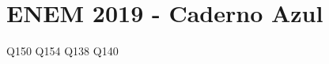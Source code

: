 \chapter{ENEM 2019 - Caderno Azul}

\begin{multicols}{2}
{Q150}
{Q154}
{Q138}
{Q140}
%
%
    
\end{multicols}



